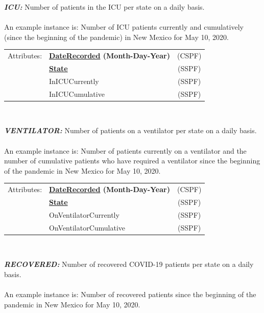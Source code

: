 \documentclass[11pt]{article}
\begin{document}
\begin{description}
\item{\em\bf ICU:} Number of patients in the ICU per state on a daily basis. \\ \\

An example instance is: Number of ICU patients currently and cumulatively (since the beginning of the pandemic) in New Mexico for May 10, 2020. \\
 
\begin{tabular}{llc}
 Attributes: & {\bf \underline{DateRecorded} (Month-Day-Year)} &  (CSPF) \\
	    & {\bf \underline{State}} &  (SSPF) \\
	    & InICUCurrently & (SSPF) \\
	    & InICUCumulative & (SSPF) \\
\end{tabular} \\

\item{\em\bf VENTILATOR:} Number of patients on a ventilator per state on a daily basis. \\ \\

An example instance is: Number of patients currently on a ventilator and the number of cumulative patients who have required a ventilator since the beginning of the pandemic in New Mexico for May 10, 2020. \\
 
\begin{tabular}{llc}
 Attributes: & {\bf \underline{DateRecorded} (Month-Day-Year)} &  (CSPF) \\
	    & {\bf \underline{State}} &  (SSPF) \\
	    & OnVentilatorCurrently & (SSPF) \\
	    & OnVentilatorCumulative & (SSPF) \\
\end{tabular} \\

\pagebreak

\item{\em\bf RECOVERED:} Number of recovered COVID-19 patients per state on a daily basis. \\ \\

An example instance is: Number of recovered patients since the beginning of the pandemic in New Mexico for May 10, 2020. \\
 

\end{description}
\end{document}
